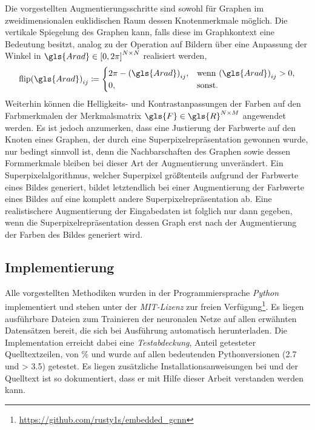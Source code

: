 Die vorgestellten Augmentierungsschritte sind sowohl für Graphen im zweidimensionalen euklidischen Raum \bzw{} dessen Knotenmerkmale möglich.
Die vertikale Spiegelung des Graphen kann, falls diese im Graphkontext eine Bedeutung besitzt, analog zu der Operation auf Bildern über eine Anpassung der Winkel in $\gls{Arad} \in {\left[0, 2\pi\right]}^{N \times N}$ realisiert werden, \dhe{}
\begin{equation*}
  {\mathrm{flip}\left(\gls{Arad}\right)}_{ij} \coloneqq \begin{cases}
    2\pi - {\left(\gls{Arad}\right)}_{ij}, & \text{wenn } {\left(\gls{Arad}\right)}_{ij} > 0,\\
    0, & \text{sonst.}
  \end{cases}
\end{equation*}
Weiterhin können die Helligkeits- und Kontrastanpassungen der Farben auf den Farbmerkmalen der Merkmalsmatrix $\gls{F} \in \gls{R}^{N \times M}$ angewendet werden.
Es ist jedoch anzumerken, dass eine Justierung der Farbwerte auf den Knoten eines Graphen, der durch eine Superpixelrepräsentation gewonnen wurde, nur bedingt sinnvoll ist, denn die Nachbarschaften des Graphen sowie dessen Formmerkmale bleiben bei dieser Art der Augmentierung unverändert.
Ein Superpixelalgorithmus, welcher Superpixel größtenteils aufgrund der Farbwerte eines Bildes generiert, bildet letztendlich bei einer Augmentierung der Farbwerte eines Bildes auf eine komplett andere Superpixelrepräsentation ab.
Eine realistischere Augmentierung der Eingabedaten ist folglich nur dann gegeben, wenn die Superpixelrepräsentation \bzw{} dessen Graph erst nach der Augmentierung der Farben des Bildes generiert wird.

\subsection{Implementierung}
\label{implementierung}

Alle vorgestellten Methodiken wurden in der Programmiersprache \emph{Python} implementiert und stehen unter der \emph{MIT-Lizenz} zur freien Verfügung\footnote{\url{https://github.com/rusty1s/embedded\_gcnn}}.
Es liegen ausführbare Dateien zum Trainieren der neuronalen Netze auf allen erwähnten Datensätzen bereit, die sich bei Ausführung automatisch herunterladen.
Die Implementation erreicht dabei eine \emph{Testabdeckung}, \dhe{} Anteil getesteter Quelltextzeilen, von \codecov{}\% und wurde auf allen bedeutenden Pythonversionen (2.7 und > 3.5) getestet.
Es liegen zusätzliche Installationsanweisungen bei und der Quelltext ist so dokumentiert, dass er mit Hilfe dieser Arbeit verstanden werden kann.

